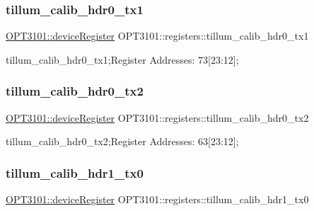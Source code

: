\subsubsection{\texorpdfstring{tillum\+\_\+calib\+\_\+hdr0\+\_\+tx1}{tillum\_calib\_hdr0\_tx1}}
{\footnotesize\ttfamily \mbox{\hyperlink{class_o_p_t3101_1_1device_register}{O\+P\+T3101\+::device\+Register}} O\+P\+T3101\+::registers\+::tillum\+\_\+calib\+\_\+hdr0\+\_\+tx1}



tillum\+\_\+calib\+\_\+hdr0\+\_\+tx1;Register Addresses\+: 73\mbox{[}23\+:12\mbox{]}; 

\mbox{\label{class_o_p_t3101_1_1registers_aef1c6804438384ec503ad3e8d688424a}} 
\subsubsection{\texorpdfstring{tillum\+\_\+calib\+\_\+hdr0\+\_\+tx2}{tillum\_calib\_hdr0\_tx2}}
{\footnotesize\ttfamily \mbox{\hyperlink{class_o_p_t3101_1_1device_register}{O\+P\+T3101\+::device\+Register}} O\+P\+T3101\+::registers\+::tillum\+\_\+calib\+\_\+hdr0\+\_\+tx2}



tillum\+\_\+calib\+\_\+hdr0\+\_\+tx2;Register Addresses\+: 63\mbox{[}23\+:12\mbox{]}; 

\mbox{\label{class_o_p_t3101_1_1registers_a0dafe331584ae9d58e692f33e5b7350b}} 
\subsubsection{\texorpdfstring{tillum\+\_\+calib\+\_\+hdr1\+\_\+tx0}{tillum\_calib\_hdr1\_tx0}}
{\footnotesize\ttfamily \mbox{\hyperlink{class_o_p_t3101_1_1device_register}{O\+P\+T3101\+::device\+Register}} O\+P\+T3101\+::registers\+::tillum\+\_\+calib\+\_\+hdr1\+\_\+tx0}



